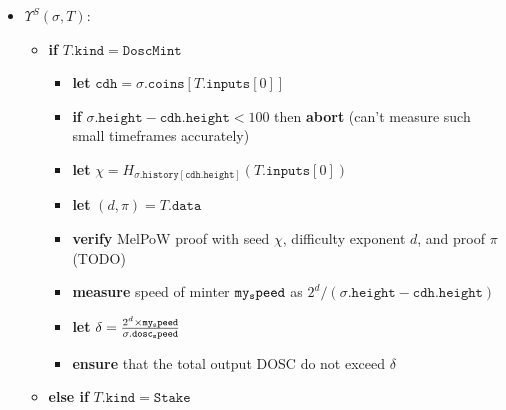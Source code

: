 \documentclass[
]{article}
\providecommand{\tightlist}{%
  \setlength{\itemsep}{0pt}\setlength{\parskip}{0pt}}
\begin{document}
\begin{itemize}
  \tightlist
  \item
        \(\Upsilon^S(\sigma,T)\):

        \begin{itemize}
          \tightlist
          \item
                \textbf{if} \(T.\mathtt{kind}=\mathtt{DoscMint}\)

                \begin{itemize}
                  \tightlist
                  \item
                        \textbf{let}
                        \(\mathtt{cdh}=\sigma.\mathtt{coins}[T.\mathtt{inputs}[0]]\)
                  \item
                        \textbf{if} \(\sigma.\mathtt{height} - \mathtt{cdh.height} < 100\)
                        then \textbf{abort} (can't measure such small timeframes
                        accurately)
                  \item
                        \textbf{let}
                        \(\chi=H_{\sigma.\mathtt{history}[\mathtt{cdh.height}]}(T.\mathtt{inputs}[0])\)
                  \item
                        \textbf{let} \((d, \pi) = T.\mathtt{data}\)
                  \item
                        \textbf{verify} MelPoW proof with seed \(\chi\), difficulty
                        exponent \(d\), and proof \(\pi\) (TODO)
                  \item
                        \textbf{measure} speed of minter \(\mathtt{my\\_speed}\) as
                        \(2^d/(\sigma.\mathtt{height} - \mathtt{cdh.height})\)
                  \item
                        \textbf{let}
                        \(\delta=\frac{2^d \times \mathtt{my\\_speed}}{\sigma.\mathtt{dosc\\_speed}}\)
                  \item
                        \textbf{ensure} that the total output DOSC do not exceed
                        \(\delta\)
                \end{itemize}
          \item
                \textbf{else if} \(T.\mathtt{kind}=\mathtt{Stake}\)


\end{itemize}
\end{itemize}
\end{document}

